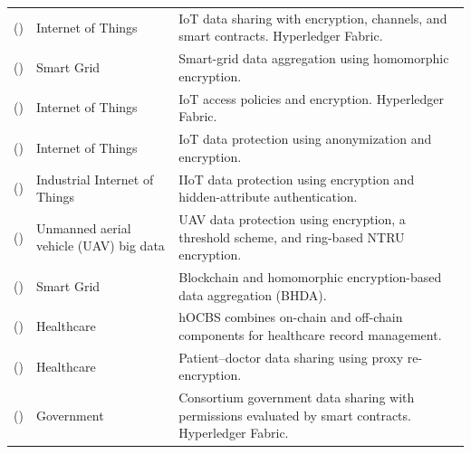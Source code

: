 \begin{longtable}{@{}>{\raggedright\arraybackslash}m{}>{\raggedright\arraybackslash}m{}>{\raggedright\arraybackslash}m{}@{}}
\addlinespace[5pt]
\cite{2020-privy-sharing} (\citeyear{2020-privy-sharing}) & Internet of Things & IoT data sharing with encryption, channels, and smart contracts. Hyperledger Fabric. \\
\addlinespace[5pt]
\cite{2021-edge-light-smart-grid} (\citeyear{2021-edge-light-smart-grid}) & Smart Grid & Smart-grid data aggregation using homomorphic encryption. \\
\addlinespace[5pt]
\cite{2021-privacy-fog-iot} (\citeyear{2021-privacy-fog-iot}) & Internet of Things & IoT access policies and encryption. Hyperledger Fabric. \\
\addlinespace[5pt]
\cite{2021-data-priv-iot} (\citeyear{2021-data-priv-iot}) & Internet of Things & IoT data protection using anonymization and encryption. \\
\addlinespace[5pt]
\cite{2021-data-sec-sharing} (\citeyear{2021-data-sec-sharing}) & Industrial Internet of Things & IIoT data protection using encryption and hidden-attribute authentication. \\
\addlinespace[5pt]
\cite{2021-drone-big-data} (\citeyear{2021-drone-big-data}) & Unmanned aerial vehicle (UAV) big data & UAV data protection using encryption, a threshold scheme, and ring-based NTRU encryption. \\
\addlinespace[5pt]
\cite{2021-homomo-enc-smart-grid} (\citeyear{2021-homomo-enc-smart-grid}) & Smart Grid & Blockchain and homomorphic encryption-based data aggregation (BHDA). \\
\addlinespace[5pt]
\cite{2021-hOCBS} (\citeyear{2021-hOCBS}) & Healthcare & hOCBS combines on-chain and off-chain components for healthcare record management. \\
\addlinespace[5pt]
\cite{2021-sp-chain} (\citeyear{2021-sp-chain}) & Healthcare & Patient--doctor data sharing using proxy re-encryption. \\
\addlinespace[5pt]
\cite{2021-priv-gov-soc} (\citeyear{2021-priv-gov-soc}) & Government & Consortium government data sharing with permissions evaluated by smart contracts. Hyperledger Fabric. \\
\end{longtable}
\endgroup

